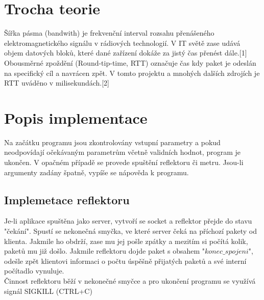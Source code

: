 \documentclass[11pt]{article}
\begin{document}
	\section{Trocha teorie}
	\begin{flushleft}
		Šířka pásma (bandwith) je frekvenční interval rozsahu přenášeného elektromagnetického signálu v rádiových technologií. V IT světě zase udává objem datových bloků, které dané zařízení dokáže za jistý čas přenést dále.[1]\\[0.5 cm] 	
		Obousměrné zpoždění (Round-tip-time, RTT) označuje čas kdy paket je odeslán na specifický cíl a navrácen zpět. V tomto projektu a mnohých dalších zdrojích je RTT uváděno v milisekundách.[2]	
	\end{flushleft}
	
	\newpage
	\section{Popis implementace}
		\begin{flushleft}
			Na začátku programu jsou zkontrolovány vstupní parametry a pokud neodpovídají očekávaným parametrům včetně validních hodnot, program je ukončen. V opačném případě se provede spuštění reflektoru či metru. Jsou-li argumenty zadány špatně, vypíše se nápověda k programu.
		\end{flushleft}
		\subsection{Implemetace reflektoru}
			\begin{flushleft}
				Je-li aplikace spuštěna jako server, vytvoří se socket a reflektor přejde do stavu "čekání". Spustí se nekonečná smyčka, ve které server čeká na příchozí pakety od klienta. Jakmile ho obdrží, zase mu jej pošle zpátky a mezitím si počítá kolik, paketů mu již došlo. Jakmile reflektoru dojde paket s obsahem "$konec\_spojeni$", odešle zpět klientovi informaci o počtu úspěšně přijatých paketů a své interní počítadlo vynuluje.\\[0.5 cm]	
				Činnost reflektoru běží v nekonečné smyčce a pro ukončení programu se využívá signál SIGKILL (CTRL+C)\par	
			\end{flushleft}
			
\end{document}
